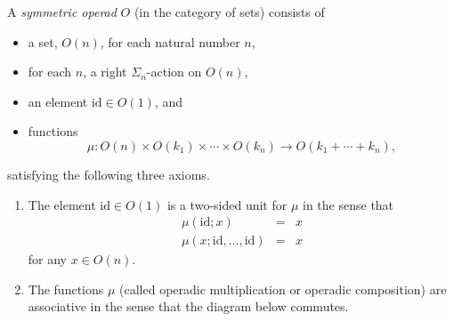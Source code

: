 \documentclass{amsbook} %
\numberwithin{section}{chapter}
\begin{document}
\begin{Defi}
A \textit{symmetric operad} $O$ (in the category of sets) consists of
\begin{itemize}
\item a set, $O(n)$, for each natural number $n$,
\item for each $n$, a right $\Sigma_{n}$-action on $O(n)$,
\item an element $\textrm{id} \in O(1)$, and
\item functions
\[
\mu: O(n) \times O(k_{1}) \times \cdots \times O(k_{n}) \rightarrow O(k_{1} + \cdots + k_{n}),
\]
\end{itemize}
satisfying the following three axioms.
\begin{enumerate}
\item The element $\textrm{id} \in O(1)$ is a two-sided unit for $\mu$ in the sense that
\[
\begin{array}{rcl}
\mu(\textrm{id}; x) & = & x \\
\mu(x; \textrm{id}, \ldots, \textrm{id}) & = & x
\end{array}
\]
for any $x \in O(n)$.
\item The functions $\mu$ (called operadic multiplication or operadic composition) are associative in the sense that the diagram below commutes.


\end{enumerate}
\end{Defi}
\end{document}
